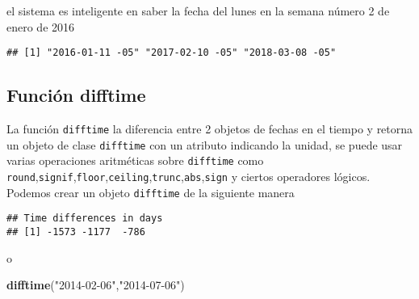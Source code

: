 \documentclass[]{article}
\newenvironment{Shaded}{\begin{snugshade}}{\end{snugshade}}
\newcommand{\KeywordTok}[1]{\textcolor[rgb]{0.13,0.29,0.53}{\textbf{#1}}}
\newcommand{\StringTok}[1]{\textcolor[rgb]{0.31,0.60,0.02}{#1}}
\newcommand{\NormalTok}[1]{#1}
\begin{document}
el sistema es inteligente en saber la fecha del lunes en la semana
número 2 de enero de 2016

\begin{Shaded}
\end{Shaded}

\begin{verbatim}
## [1] "2016-01-11 -05" "2017-02-10 -05" "2018-03-08 -05"
\end{verbatim}

\subsection{Función difftime}\label{funciuxf3n-difftime}

La función \texttt{difftime} la diferencia entre 2 objetos de fechas en
el tiempo y retorna un objeto de clase \texttt{difftime} con un atributo
indicando la unidad, se puede usar varias operaciones aritméticas sobre
\texttt{difftime} como
\texttt{round},\texttt{signif},\texttt{floor},\texttt{ceiling},\texttt{trunc},\texttt{abs},\texttt{sign}
y ciertos operadores lógicos. Podemos crear un objeto \texttt{difftime}
de la siguiente manera

\begin{Shaded}
\end{Shaded}

\begin{verbatim}
## Time differences in days
## [1] -1573 -1177  -786
\end{verbatim}

o

\begin{Shaded}
\begin{Highlighting}[]
\KeywordTok{difftime}\NormalTok{(}\StringTok{"2014-02-06"}\NormalTok{,}\StringTok{"2014-07-06"}\NormalTok{)}
\end{Highlighting}
\end{Shaded}
\end{document}
